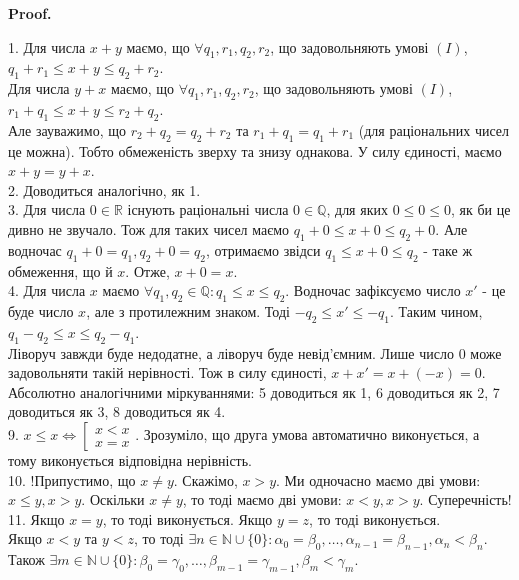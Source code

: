 \documentclass[a4paper, 14pt]{article}
\makeatletter
\def\qed{$\blacksquare$}
\theoremstyle{theoremdd}
\theoremstyle{theoremdd}
\theoremstyle{theoremdd}
\theoremstyle{theoremdd}
\theoremstyle{theoremdd}
\theoremstyle{theoremdd}
\theoremstyle{theoremdd}
\theoremstyle{theoremdd}
\renewenvironment{proof}[1][Proof.\\]{\par
\pushQED{\hfill \qed}%
\normalfont \topsep6\p@\@plus6\p@\relax
\trivlist
\item\relax
{\bfseries
#1\@addpunct{.}}\hspace\labelsep\ignorespaces
}{%
\popQED\endtrivlist\@endpefalse
}
\makeatother
\begin{document}
	\begin{proof}
	1. Для числа $x+y$ маємо, що $\forall q_1, r_1, q_2, r_2$, що задовольняють умові $(I)$, $q_1 + r_1 \leq x + y \leq q_2 + r_2$.\\
	Для числа $y+x$ маємо, що $\forall q_1, r_1, q_2, r_2$, що задовольняють умові $(I)$, $r_1 + q_1 \leq x + y \leq r_2 + q_2$.\\
	Але зауважимо, що $r_2 + q_2 = q_2 + r_2$ та $r_1 + q_1 = q_1 + r_1$ (для раціональних чисел це можна). Тобто обмеженість зверху та знизу однакова. У силу єдиності, маємо $x + y = y + x$.
	\bigskip \\
	2. Доводиться аналогічно, як 1.
	\bigskip \\
	3. Для числа $0 \in \mathbb{R}$ існують раціональні числа $0 \in \mathbb{Q}$, для яких $0 \leq 0 \leq 0$, як би це дивно не звучало. Тож для таких чисел маємо $q_1 + 0 \leq x + 0 \leq q_2 + 0$. Але водночас $q_1 + 0 = q_1, q_2 + 0 = q_2$, отримаємо звідси $q_1 \leq x + 0 \leq q_2$ - таке ж обмеження, що й $x$. Отже, $x + 0 = x$.
	\bigskip \\
	4. Для числа $x$ маємо $\forall q_1,q_2 \in \mathbb{Q}: q_1 \leq x \leq q_2$. Водночас зафіксуємо число $x'$ - це буде число $x$, але з протилежним знаком. Тоді $-q_2 \leq x' \leq -q_1$. Таким чином,\\
	$q_1 - q_2 \leq x \leq q_2 - q_1$.\\
	Ліворуч завжди буде недодатне, а ліворуч буде невід'ємним. Лише число $0$ може задовольняти такій нерівності. Тож в силу єдиності, $x + x' = x + (-x) = 0$.
	\bigskip \\
	Абсолютно аналогічними міркуваннями: 5 доводиться як 1, 6 доводиться як 2, 7 доводиться як 3, 8 доводиться як 4.
	\bigskip \\
	9. $x \leq x \iff \left[ \begin{gathered} x < x \\ x = x \end{gathered} \right.$. Зрозуміло, що друга умова автоматично виконується, а тому виконується відповідна нерівність.
	\bigskip \\
	10. !Припустимо, що $x \neq y$. Скажімо, $x > y$. Ми одночасно маємо дві умови: $x \leq y, x > y$. Оскільки $x \neq y$, то тоді маємо дві умови: $x < y, x > y$. Суперечність!
	\bigskip \\
	11. Якщо $x = y$, то тоді виконується. Якщо $y = z$, то тоді виконується. \\
	Якщо $x < y$ та $y < z$, то тоді $\exists n \in \mathbb{N} \cup \{0\}: \alpha_0 = \beta_0, \dots, \alpha_{n-1} = \beta_{n-1}, \alpha_n < \beta_n$. Також $\exists m \in \mathbb{N} \cup \{0\}: \beta_0 = \gamma_0, \dots, \beta_{m-1} = \gamma_{m-1}, \beta_m < \gamma_m$.\\

\end{proof}
\end{document}
